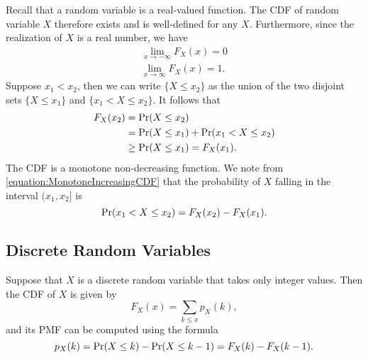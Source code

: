 Recall that a random variable is a real-valued function.
The CDF of random variable $X$ therefore exists and is well-defined for any $X$.
Furthermore, since the realization of $X$ is a real number, we have
\begin{gather*}
\lim_{x \rightarrow - \infty} F_X (x) = 0 \\
\lim_{x \rightarrow \infty} F_X (x) = 1.
\end{gather*}
Suppose $x_1 < x_2$, then we can write $\{ X \leq x_2 \}$ as the union of the two disjoint sets $\{ X \leq x_1 \}$ and $\{ x_1 < X \leq x_2 \}$.
It follows that
\begin{equation} \label{equation:MonotoneIncreasingCDF}
\begin{split}
F_X (x_2) &= \Pr (X \leq x_2) \\
&= \Pr (X \leq x_1) + \Pr (x_1 < X \leq x_2) \\
&\geq \Pr (X \leq x_1) = F_X (x_1).
\end{split}
\end{equation}
The CDF is a monotone non-decreasing function.
We note from \eqref{equation:MonotoneIncreasingCDF} that the probability of $X$ falling in the interval $(x_1, x_2]$ is
\begin{equation} \label{equation:IntervalCDF}
\Pr (x_1 < X \leq x_2) = F_X (x_2) - F_X (x_1).
\end{equation}

\subsection{Discrete Random Variables}

Suppose that $X$ is a discrete random variable that takes only integer values.
Then the CDF of $X$ is given by
\begin{equation*}
F_X (x) = \sum_{k \leq x} p_X (k),
\end{equation*}
and its PMF can be computed using the formula
\begin{equation*}
p_X (k) = \Pr ( X \leq k) - \Pr (X \leq k -1 ) = F_X (k) - F_X (k-1).
\end{equation*}


